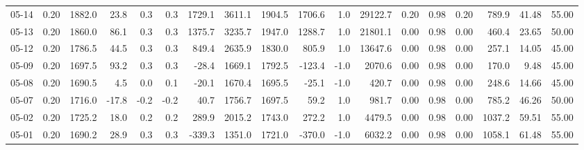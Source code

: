 \begin{threeparttable}
{\begin{tabular}{lrrrrrrrrrrrrrrrrr}
  05-14 &     0.20 & 1882.0 &              23.8 &               0.3 &                0.3 &             1729.1 & 3611.1 & 1904.5 &     1706.6 &                      1.0 &             29122.7 &       0.20 &      0.98 &           0.20 &            789.9 &           41.48 &                  55.00 \\
  05-13 &     0.20 & 1860.0 &              86.1 &               0.3 &                0.3 &             1375.7 & 3235.7 & 1947.0 &     1288.7 &                      1.0 &             21801.1 &       0.00 &      0.98 &           0.00 &            460.4 &           23.65 &                  50.00 \\
  05-12 &     0.20 & 1786.5 &              44.5 &               0.3 &                0.3 &              849.4 & 2635.9 & 1830.0 &      805.9 &                      1.0 &             13647.6 &       0.00 &      0.98 &           0.00 &            257.1 &           14.05 &                  45.00 \\
  05-09 &     0.20 & 1697.5 &              93.2 &               0.3 &                0.3 &              -28.4 & 1669.1 & 1792.5 &     -123.4 &                     -1.0 &              2070.6 &       0.00 &      0.98 &           0.00 &            170.0 &            9.48 &                  45.00 \\
  05-08 &     0.20 & 1690.5 &               4.5 &               0.0 &                0.1 &              -20.1 & 1670.4 & 1695.5 &      -25.1 &                     -1.0 &               420.7 &       0.00 &      0.98 &           0.00 &            248.6 &           14.66 &                  45.00 \\
  05-07 &     0.20 & 1716.0 &             -17.8 &              -0.2 &               -0.2 &               40.7 & 1756.7 & 1697.5 &       59.2 &                      1.0 &               981.7 &       0.00 &      0.98 &           0.00 &            785.2 &           46.26 &                  50.00 \\
  05-02 &     0.20 & 1725.2 &              18.0 &               0.2 &                0.2 &              289.9 & 2015.2 & 1743.0 &      272.2 &                      1.0 &              4479.5 &       0.00 &      0.98 &           0.00 &           1037.2 &           59.51 &                  55.00 \\
  05-01 &     0.20 & 1690.2 &              28.9 &               0.3 &                0.3 &             -339.3 & 1351.0 & 1721.0 &     -370.0 &                     -1.0 &              6032.2 &       0.00 &      0.98 &           0.00 &           1058.1 &           61.48 &                  55.00 \\

\end{tabular}}
\end{threeparttable}

